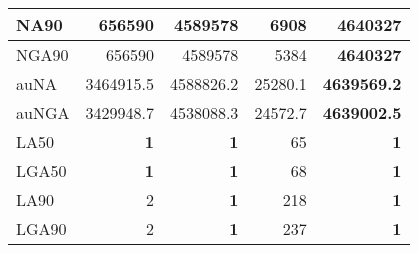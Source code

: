 \documentclass[12pt,a4paper]{article}
\begin{document}
\begin{table}[ht]
\begin{center}
\begin{tabular}{|l*{4}{|r}|}
NA90 & 656590 & 4589578 & 6908 & {\bf 4640327} \\ \hline
NGA90 & 656590 & 4589578 & 5384 & {\bf 4640327} \\ \hline
auNA & 3464915.5 & 4588826.2 & 25280.1 & {\bf 4639569.2} \\ \hline
auNGA & 3429948.7 & 4538088.3 & 24572.7 & {\bf 4639002.5} \\ \hline
LA50 & {\bf 1} & {\bf 1} & 65 & {\bf 1} \\ \hline
LGA50 & {\bf 1} & {\bf 1} & 68 & {\bf 1} \\ \hline
LA90 & 2 & {\bf 1} & 218 & {\bf 1} \\ \hline
LGA90 & 2 & {\bf 1} & 237 & {\bf 1} \\ \hline
\end{tabular}
\end{center}
\end{table}
\end{document}
